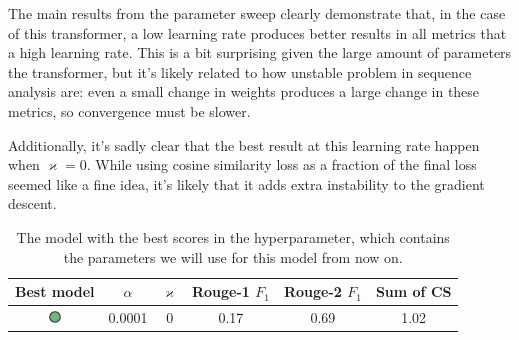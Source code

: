 The main results from the parameter sweep clearly demonstrate that, in the case of this transformer, a low learning rate produces better results in all metrics that a high learning rate.
This is a bit surprising given the large amount of parameters the transformer, but it's likely related to how unstable problem in sequence analysis are: even a small change in weights produces a large change in these metrics, so convergence must be slower.

Additionally, it's sadly clear that the best result at this learning rate happen when $\varkappa = 0$.
While using cosine similarity loss as a fraction of the final loss seemed like a fine idea, it's likely that it adds extra instability to the gradient descent.

\begin{table}[h]
	\centering
	\begin{tabular}{c | c c | c c c}
		\toprule
			Best model & $\alpha$ & $\varkappa$ & Rouge-1 $F_1$ & Rouge-2 $F_1$ & Sum of CS \\
		\midrule
			\includegraphics[width=9pt,height=9pt]{green_circle.png} & 0.0001 & 0 & 0.17 & 0.69 & 1.02 \\
		\bottomrule
	\end{tabular}
	\caption{The model with the best scores in the hyperparameter, which contains the parameters we will use for this model from now on.}

\end{table}
